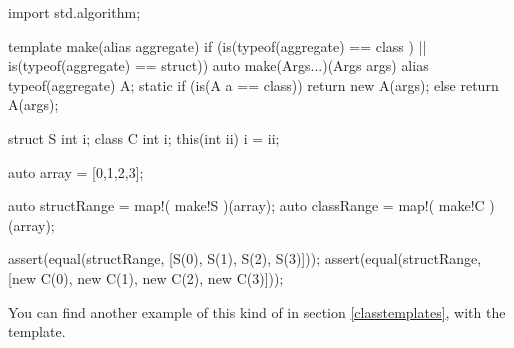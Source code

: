 \begin{dcode}
import std.algorithm;

template make(alias aggregate) 
    if (is(typeof(aggregate) == class ) 
     || is(typeof(aggregate) == struct))
{
    auto make(Args...)(Args args)
    {
        alias typeof(aggregate) A;        
        static if (is(A a == class))
            return new A(args);
        else
            return A(args);
    }
}

struct S {int i;}
class C {int i; this(int ii) { i = ii;}}

auto array = [0,1,2,3];

auto structRange = map!( make!S )(array);
auto classRange  = map!( make!C )(array);

assert(equal(structRange, [S(0), S(1), S(2), S(3)]));
assert(equal(structRange, [new C(0), new C(1), new C(2), new C(3)]));
\end{dcode}

You can find another example of this kind of  in section \ref{classtemplates}, with the  template.

